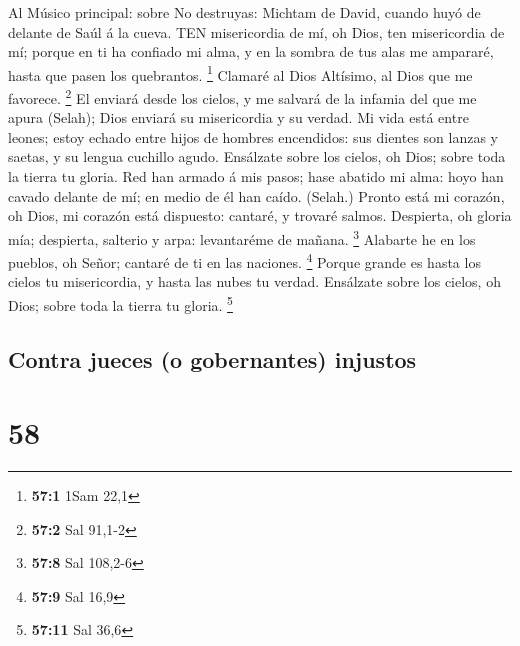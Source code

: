  Al Músico principal: sobre No destruyas: Michtam de David,
cuando huyó de delante de Saúl á la cueva. TEN misericordia de mí, oh
Dios, ten misericordia de mí; porque en ti ha confiado mi alma, y en la
sombra de tus alas me ampararé, hasta que pasen los quebrantos.
\footnote{\textbf{57:1} 1Sam 22,1}  Clamaré al Dios
Altísimo, al Dios que me favorece. \footnote{\textbf{57:2} Sal 91,1-2}
 El enviará desde los cielos, y me salvará de la infamia del
que me apura (Selah); Dios enviará su misericordia y su verdad.
 Mi vida está entre leones; estoy echado entre hijos de
hombres encendidos: sus dientes son lanzas y saetas, y su lengua
cuchillo agudo.  Ensálzate sobre los cielos, oh Dios; sobre
toda la tierra tu gloria.  Red han armado á mis pasos; hase
abatido mi alma: hoyo han cavado delante de mí; en medio de él han
caído. (Selah.)  Pronto está mi corazón, oh Dios, mi corazón
está dispuesto: cantaré, y trovaré salmos.  Despierta, oh
gloria mía; despierta, salterio y arpa: levantaréme de mañana.
\footnote{\textbf{57:8} Sal 108,2-6}  Alabarte he en los
pueblos, oh Señor; cantaré de ti en las naciones. \footnote{\textbf{57:9}
  Sal 16,9}  Porque grande es hasta los cielos tu
misericordia, y hasta las nubes tu verdad.  Ensálzate sobre
los cielos, oh Dios; sobre toda la tierra tu gloria. \footnote{\textbf{57:11}
  Sal 36,6}

\hypertarget{contra-jueces-o-gobernantes-injustos}{%
\subsection{Contra jueces (o gobernantes)
injustos}\label{contra-jueces-o-gobernantes-injustos}}

\hypertarget{section-57}{%
\section{58}\label{section-57}}

